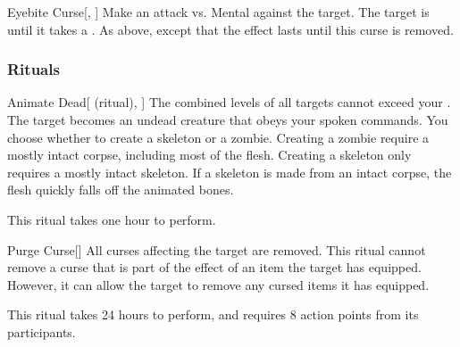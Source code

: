 \lowercase{\hypertarget{spell:Eyebite Curse}{}}\label{spell:Eyebite Curse}
\begin{freeability}[Rank 8]{\hypertarget{spell:Eyebite Curse}{Eyebite Curse}}[, ]
Make an attack vs. Mental against the target.
\hit The target is  until it takes a .
\crit As above, except that the effect lasts until this curse is removed.
\end{freeability}
\vspace{0.25em}



\subsubsection{Rituals}


\lowercase{\hypertarget{spell:Animate Dead}{}}\label{spell:Animate Dead}
\begin{attuneability}[Rank 3]{\hypertarget{spell:Animate Dead}{Animate Dead}}[ (ritual), ]
The combined levels of all targets cannot exceed your .
The target becomes an undead creature that obeys your spoken commands.
You choose whether to create a skeleton or a zombie.
Creating a zombie require a mostly intact corpse, including most of the flesh.
Creating a skeleton only requires a mostly intact skeleton.
If a skeleton is made from an intact corpse, the flesh quickly falls off the animated bones.

This ritual takes one hour to perform.
\end{attuneability}
\vspace{0.25em}



\lowercase{\hypertarget{spell:Purge Curse}{}}\label{spell:Purge Curse}
\begin{apability}[Rank 3]{\hypertarget{spell:Purge Curse}{Purge Curse}}[]
All curses affecting the target are removed.
This ritual cannot remove a curse that is part of the effect of an item the target has equipped.
However, it can allow the target to remove any cursed items it has equipped.

This ritual takes 24 hours to perform, and requires 8 action points from its participants.
\end{apability}
\vspace{0.25em}



